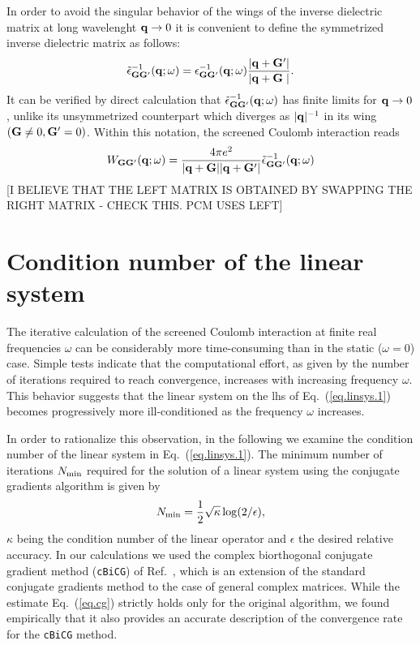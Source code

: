 \documentclass[twocolumn,prb,showpacs,superscriptaddress]{revtex4}
\def\w{\omega}
\def\q{{\bf q}}
\def\G{{\bf G}}
\def\Gp{{\bf G^\prime}}
\begin{document}
In order to avoid the singular behavior of the wings of the inverse dielectric matrix 
at long wavelenght $\q\rightarrow 0$ it is convenient to define the symmetrized inverse
dielectric matrix as follows:\cite{balde_tosa}
  \begin{equation}
  \tilde\epsilon^{-1}_{\G\Gp}(\q;\w) = \epsilon^{-1}_{\G\Gp}(\q;\w)  \frac{|\q+\Gp|}{|\q+\G\phantom{^\prime}|}.
  \end{equation}
It can be verified by direct calculation that $\tilde\epsilon^{-1}_{\G\Gp}(\q;\w)$
has finite limits for $\q\rightarrow 0$, unlike its unsymmetrized counterpart
which diverges as $|\q|^{-1}$ in its wing $(\G\ne 0,\Gp=0)$.
Within this notation, the screened Coulomb interaction reads
  \begin{equation}
  W_{\G\Gp}(\q;\w) =   \frac{4\pi e^2}{|\q+\G||\q+\Gp|} \tilde\epsilon^{-1}_{\G\Gp}(\q;\w)
  \end{equation}
[I BELIEVE THAT THE LEFT MATRIX IS OBTAINED BY SWAPPING THE RIGHT MATRIX - CHECK THIS.
PCM USES LEFT]


\section{Condition number of the linear system}

The iterative calculation of the screened Coulomb interaction at finite real
frequencies $\w$ can be considerably more time-consuming than in the static
($\w=0$) case. Simple tests indicate that the computational effort, as given
by the number of iterations required to reach convergence, increases with 
increasing frequency $\w$. This behavior suggests that the linear system 
on the lhs of Eq.\ (\ref{eq.linsys.1}) becomes progressively more ill-conditioned 
as the frequency $\w$ increases.

In order to rationalize this observation, in the following we examine
the condition number of the linear system in Eq.\ (\ref{eq.linsys.1}).
The minimum number of iterations $N_{\rm min}$ required for the solution of
a linear system using the conjugate gradients algorithm is given by
  \begin{equation}\label{eq.cg}
  N_{\rm min} = \frac{1}{2}\sqrt{\kappa} \log(2/\epsilon),
  \end{equation}
$\kappa$ being the condition number of the linear operator and $\epsilon$ the
desired relative accuracy.\cite{painless.cg} In our calculations we used the 
complex biorthogonal conjugate gradient method ({\tt cBiCG}) of Ref.\ ,
which is an extension of the standard conjugate gradients method to the 
case of general complex matrices. While the estimate Eq.\ (\ref{eq.cg}) strictly 
holds only for the original algorithm, we found empirically that it also 
provides an accurate description of the convergence rate for the {\tt cBiCG} 
method.
\end{document}
